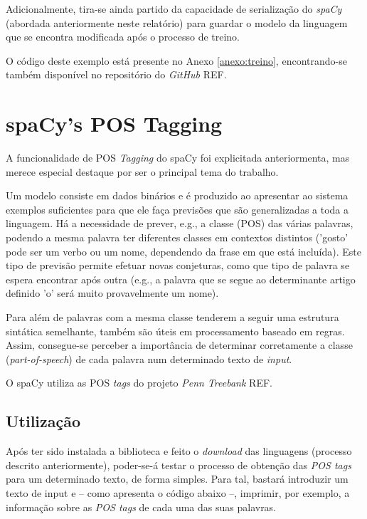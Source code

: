 \documentclass[12pt]{article}
\begin{document}
Adicionalmente, tira-se ainda partido da capacidade de serialização do \textit{spaCy} (abordada anteriormente neste relatório) para guardar o modelo da linguagem que se encontra modificada após o processo de treino.

O código deste exemplo está presente no Anexo \ref{anexo:treino}, encontrando-se também disponível no repositório do \textit{GitHub} {{REF}}.



\section{spaCy's POS Tagging} %

A funcionalidade de POS \textit{Tagging} do spaCy foi explicitada anteriormenta, mas merece especial destaque por ser o principal tema do trabalho.

Um modelo consiste em dados binários e é produzido ao apresentar ao sistema exemplos suficientes para que ele faça previsões que são generalizadas a toda a linguagem. Há a necessidade de prever, e.g., a classe (POS) das várias palavras, podendo a mesma palavra ter diferentes classes em contextos distintos ('gosto' pode ser um verbo ou um nome, dependendo da frase em que está incluída). Este tipo de previsão permite efetuar novas conjeturas, como que tipo de palavra se espera encontrar após outra (e.g., a palavra que se segue ao determinante artigo definido 'o' será muito provavelmente um nome).

Para além de palavras com a mesma classe tenderem a seguir uma estrutura sintática semelhante, também são úteis em processamento baseado em regras. Assim, consegue-se perceber a importância de determinar corretamente a classe (\textit{part-of-speech}) de cada palavra num determinado texto de \textit{input}.

O spaCy utiliza as POS \textit{tags} do projeto \textit{Penn Treebank} {{REF}}.




\subsection{Utilização} %

Após ter sido instalada a biblioteca e feito o \textit{download} das linguagens (processo descrito anteriormente), poder-se-á testar o processo de obtenção das \textit{POS tags} para
um determinado texto, de forma simples. Para tal, bastará introduzir um texto de input e -- como apresenta o código abaixo --, imprimir, por exemplo, a informação sobre as
\textit{POS tags} de cada uma das suas palavras.
\end{document}
